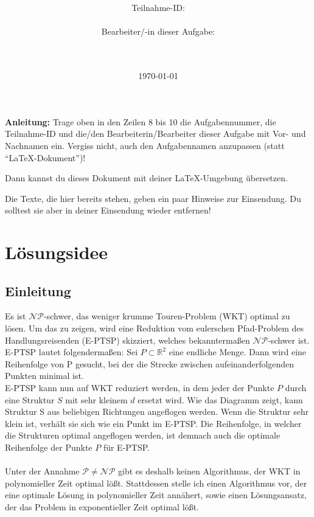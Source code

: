 \documentclass[a4paper,10pt,ngerman]{scrartcl}
\title{\textbf{\Huge\Aufgabe}}
\author{\LARGE Teilnahme-ID: \LARGE \TeilnahmeId \\\\
  \LARGE Bearbeiter/-in dieser Aufgabe: \\
  \LARGE \Name\\\\}
\date{\LARGE\today}
\begin{document}
\maketitle
\tableofcontents

\vspace{0.5cm}

\textbf{Anleitung:} Trage oben in den Zeilen 8 bis 10 die Aufgabennummer, die Teilnahme-ID und die/den Bearbeiterin/Bearbeiter dieser Aufgabe mit Vor- und Nachnamen ein.
Vergiss nicht, auch den Aufgabennamen anzupassen (statt "`\LaTeX-Dokument"')!

Dann kannst du dieses Dokument mit deiner \LaTeX-Umgebung übersetzen.

Die Texte, die hier bereits stehen, geben ein paar Hinweise zur Einsendung. Du
solltest sie aber in deiner Einsendung wieder entfernen!

\section{Lösungsidee}
\subsection{Einleitung}
Es ist $\mathcal{NP}$-schwer, das weniger krumme Touren-Problem (WKT) optimal
zu lösen. Um das zu zeigen, wird eine Reduktion vom eulerschen Pfad-Problem des
Handlungsreisenden (E-PTSP) skizziert, welches bekanntermaßen
$\mathcal{NP}$-schwer ist. E-PTSP lautet folgendermaßen: Sei $P \subset
  \mathbb{R}^2$ eine endliche Menge. Dann wird eine Reihenfolge von P gesucht,
bei der die Strecke zwischen aufeinanderfolgenden Punkten minimal ist. \\
E-PTSP kann nun auf WKT reduziert werden, in dem jeder der Punkte $P$ durch
eine Struktur $S$ mit sehr kleinem $d$ ersetzt wird. Wie das Diagramm zeigt,
kann Struktur S aus beliebigen Richtungen angeflogen werden. Wenn die Struktur
sehr klein ist, verhält sie sich wie ein Punkt im E-PTSP. Die Reihenfolge, in
welcher die Strukturen optimal angeflogen werden, ist demnach auch die optimale
Reihenfolge der Punkte $P$ für E-PTSP. \\\\ Unter der Annahme $\mathcal{P} \neq
  \mathcal{NP}$ gibt es deshalb keinen Algorithmus, der WKT in polynomieller Zeit
optimal lößt. Stattdessen stelle ich einen Algorithmus vor, der eine optimale
Lösung in polynomieller Zeit annähert, sowie einen Lösungsansatz, der das
Problem in exponentieller Zeit optimal lößt.
\end{document}
